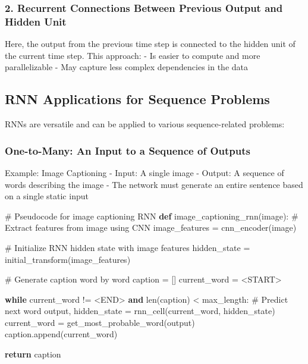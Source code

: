 \documentclass[
  letterpaper,
  DIV=11,
  numbers=noendperiod]{scrreprt}
\newenvironment{Shaded}{\begin{snugshade}}{\end{snugshade}}
\newcommand{\BuiltInTok}[1]{\textcolor[rgb]{0.00,0.23,0.31}{#1}}
\newcommand{\CommentTok}[1]{\textcolor[rgb]{0.37,0.37,0.37}{#1}}
\newcommand{\ControlFlowTok}[1]{\textcolor[rgb]{0.00,0.23,0.31}{\textbf{#1}}}
\newcommand{\KeywordTok}[1]{\textcolor[rgb]{0.00,0.23,0.31}{\textbf{#1}}}
\newcommand{\NormalTok}[1]{\textcolor[rgb]{0.00,0.23,0.31}{#1}}
\newcommand{\OperatorTok}[1]{\textcolor[rgb]{0.37,0.37,0.37}{#1}}
\newcommand{\StringTok}[1]{\textcolor[rgb]{0.13,0.47,0.30}{#1}}
\begin{document}
\subsubsection{2. Recurrent Connections Between Previous Output and
Hidden
Unit}\label{recurrent-connections-between-previous-output-and-hidden-unit}

Here, the output from the previous time step is connected to the hidden
unit of the current time step. This approach: - Is easier to compute and
more parallelizable - May capture less complex dependencies in the data

\subsection{RNN Applications for Sequence
Problems}\label{rnn-applications-for-sequence-problems}

RNNs are versatile and can be applied to various sequence-related
problems:

\subsubsection{One-to-Many: An Input to a Sequence of
Outputs}\label{one-to-many-an-input-to-a-sequence-of-outputs}

Example: Image Captioning - Input: A single image - Output: A sequence
of words describing the image - The network must generate an entire
sentence based on a single static input

\begin{Shaded}
\begin{Highlighting}[]
\CommentTok{\# Pseudocode for image captioning RNN}
\KeywordTok{def}\NormalTok{ image\_captioning\_rnn(image):}
    \CommentTok{\# Extract features from image using CNN}
\NormalTok{    image\_features }\OperatorTok{=}\NormalTok{ cnn\_encoder(image)}
    
    \CommentTok{\# Initialize RNN hidden state with image features}
\NormalTok{    hidden\_state }\OperatorTok{=}\NormalTok{ initial\_transform(image\_features)}
    
    \CommentTok{\# Generate caption word by word}
\NormalTok{    caption }\OperatorTok{=}\NormalTok{ []}
\NormalTok{    current\_word }\OperatorTok{=} \StringTok{\textquotesingle{}\textless{}START\textgreater{}\textquotesingle{}}
    
    \ControlFlowTok{while}\NormalTok{ current\_word }\OperatorTok{!=} \StringTok{\textquotesingle{}\textless{}END\textgreater{}\textquotesingle{}} \KeywordTok{and} \BuiltInTok{len}\NormalTok{(caption) }\OperatorTok{\textless{}}\NormalTok{ max\_length:}
        \CommentTok{\# Predict next word}
\NormalTok{        output, hidden\_state }\OperatorTok{=}\NormalTok{ rnn\_cell(current\_word, hidden\_state)}
\NormalTok{        current\_word }\OperatorTok{=}\NormalTok{ get\_most\_probable\_word(output)}
\NormalTok{        caption.append(current\_word)}
    
    \ControlFlowTok{return}\NormalTok{ caption}
\end{Highlighting}
\end{Shaded}
\end{document}

